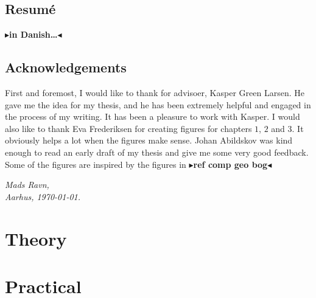 \documentclass[twoside,11pt,openright]{report}
\newcommand{\todo}[1]{{\color[rgb]{.5,0,0}\textbf{$\blacktriangleright$#1$\blacktriangleleft$}}}
\begin{document}
\chapter*{Resum\'e}

\todo{in Danish\dots}

\chapter*{Acknowledgements}

First and foremost, I would like to thank for advisoer, Kasper Green Larsen. He gave me the idea for my thesis, and he has been extremely helpful and engaged in the process of my writing. It has been a pleasure to work with Kasper.
I would also like to thank Eva Frederiksen for creating figures for chapters $1$, $2$ and $3$. It obviously helps a lot when the figures make sense. Johan Abildskov was kind enough to read an early draft of my thesis and give me some very good feedback.\\

Some of the figures are inspired by the figures in \todo{ref comp geo bog}

\vspace{2ex}
\begin{flushright}
  \emph{Mads Ravn,}\\
  \emph{Aarhus, \today.}
\end{flushright}

\tableofcontents
{}
\setcounter{secnumdepth}{2}





\part{Theory}




\part{Practical}







 

\end{document}
